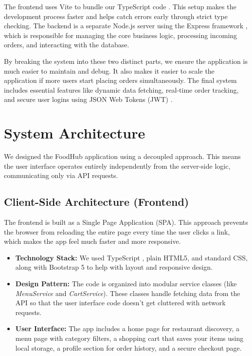 \documentclass[conference]{IEEEtran}
\begin{document}
The frontend uses Vite to bundle our TypeScript code \cite{b2}. This setup makes the development process faster and helps catch errors early through strict type checking. The backend is a separate Node.js server using the Express framework \cite{b4}, which is responsible for managing the core business logic, processing incoming orders, and interacting with the database.

By breaking the system into these two distinct parts, we ensure the application is much easier to maintain and debug. It also makes it easier to scale the application if more users start placing orders simultaneously. The final system includes essential features like dynamic data fetching, real-time order tracking, and secure user logins using JSON Web Tokens (JWT) \cite{b7}.

\section{System Architecture}
We designed the FoodHub application using a decoupled approach. This means the user interface operates entirely independently from the server-side logic, communicating only via API requests.

\subsection{Client-Side Architecture (Frontend)}
The frontend is built as a Single Page Application (SPA). This approach prevents the browser from reloading the entire page every time the user clicks a link, which makes the app feel much faster and more responsive.

\begin{itemize}
\item \textbf{Technology Stack:} We used TypeScript \cite{b2}, plain HTML5, and standard CSS, along with Bootstrap 5 to help with layout and responsive design.
\item \textbf{Design Pattern:} The code is organized into modular service classes (like \textit{MenuService} and \textit{CartService}). These classes handle fetching data from the API so that the user interface code doesn't get cluttered with network requests.
\item \textbf{User Interface:} The app includes a home page for restaurant discovery, a menu page with category filters, a shopping cart that saves your items using local storage, a profile section for order history, and a secure checkout page.
\end{itemize}
\end{document}
